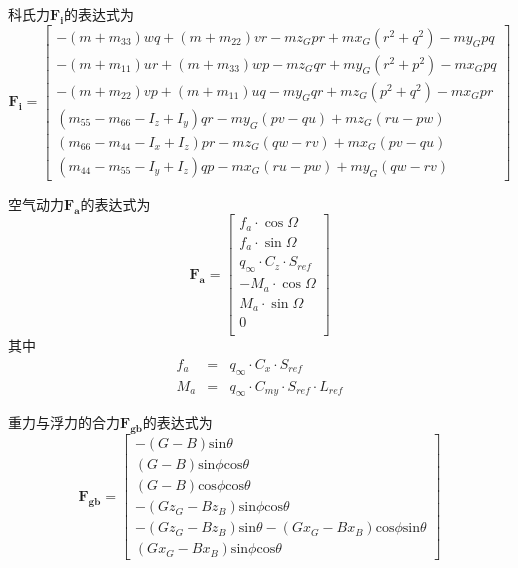 科氏力$\mathbf{F_i}$的表达式为
\begin{equation}\label{eq:Fi}
\mathbf{F_{i}}=\left[
\begin{matrix}
-(m+m_{33})wq+(m+m_{22})vr-mz_Gpr+mx_G(r^2+q^2)-my_Gpq  \\
-(m+m_{11})ur+(m+m_{33})wp-mz_Gqr+my_G(r^2+p^2)-mx_Gpq \\
-(m+m_{22})vp+(m+m_{11})uq-my_Gqr+mz_G(p^2+q^2)-mx_Gpr \\
(m_{55}-m_{66}-I_z+I_y)qr-my_G(pv-qu)+mz_G(ru-pw) \\
(m_{66}-m_{44}-I_x+I_z)pr-mz_G(qw-rv)+mx_G(pv-qu) \\
(m_{44}-m_{55}-I_y+I_z)qp-mx_G(ru-pw)+my_G(qw-rv)
\end{matrix}
\right]
\end{equation}

空气动力$\mathbf{F_a}$的表达式为
\begin{equation}\label{eq:Fa}
\mathbf{F_{a}}=\left[
\begin{matrix}
f_a\cdot\cos\Omega \\
f_a\cdot\sin\Omega \\
q_{\infty}\cdot C_z\cdot S_{ref} \\
-M_a\cdot\cos\Omega \\
M_a\cdot\sin\Omega \\
0\\
\end{matrix}
\right]
\end{equation}
其中
\begin{eqnarray}\label{eq:fa}
f_a &=& q_{\infty}\cdot C_x\cdot  S_{ref} \\
M_a &=& q_{\infty}\cdot C_{my}\cdot  S_{ref} \cdot L_{ref}
\end{eqnarray}

重力与浮力的合力$\mathbf{F_{gb}}$的表达式为
\begin{equation}\label{eq:Fgb}
\mathbf{F_{gb}}=\left[
\begin{matrix}
-(G-B)\mathrm{sin}\theta  \\
(G-B)\mathrm{sin}\phi\mathrm{cos}\theta \\
(G-B)\mathrm{cos}\phi\mathrm{cos}\theta \\
-(Gz_{G}-Bz_{B})\mathrm{sin}\phi\mathrm{cos}\theta \\
-(Gz_{G}-Bz_{B})\mathrm{sin}\theta-(Gx_{G}-Bx_{B})\mathrm{cos}\phi\mathrm{sin}\theta \\
(Gx_{G}-Bx_{B})\mathrm{sin}\phi\mathrm{cos}\theta
\end{matrix}
\right]
\end{equation}

